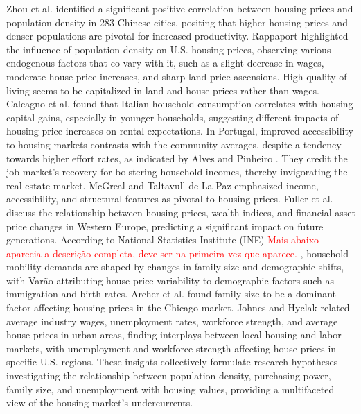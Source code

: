 \documentclass{aip-cp}
\begin{document}
Zhou et al.\cite{article_zhou} identified a significant positive correlation between housing prices and population density in 283 Chinese cities, positing that higher housing prices and denser populations are pivotal for increased productivity.
Rappaport  \cite{rappaport2008consumption} highlighted the influence of population density on U.S. housing prices, observing various endogenous factors that co-vary with it, such as a slight decrease in wages, moderate house price increases, and sharp land price ascensions. High quality of living seems to be capitalized in land and house prices rather than wages. Calcagno et al.\cite{calcagno2009effect} found that Italian household consumption correlates with housing capital gains, especially in younger households, suggesting different impacts of housing price increases on rental expectations.
In Portugal, improved accessibility to housing markets contrasts with the community averages, despite a tendency towards higher effort rates, as indicated by Alves and Pinheiro \cite{alves}. They credit the job market's recovery for bolstering household incomes, thereby invigorating the real estate market. McGreal and Taltavull de La Paz \cite{mcgreal2013implicit} emphasized income, accessibility, and structural features as pivotal to housing prices.
Fuller et al. \cite{fuller2020housing} discuss the relationship between housing prices, wealth indices, and financial asset price changes in Western Europe, predicting a significant impact on future generations. According to  National Statistics Institute (INE) \textcolor{red}{Mais abaixo aparecia a descrição completa, deve ser na primeira vez que aparece.}  \cite{INE}, household mobility demands are shaped by changes in family size and demographic shifts, with Varão \cite{varao2019determinants} attributing house price variability to demographic factors such as immigration and birth rates. Archer et al. \cite{archer2010ownership} found family size to be a dominant factor affecting housing prices in the Chicago market.
Johnes and Hyclak \cite{johnes1999house} related average industry wages, unemployment rates, workforce strength, and average house prices in urban areas, finding interplays between local housing and labor markets, with unemployment and workforce strength affecting house prices in specific U.S. regions.
These insights collectively formulate research hypotheses investigating the relationship between population density, purchasing power, family size, and unemployment with housing values, providing a multifaceted view of the housing market's undercurrents.
\end{document}
